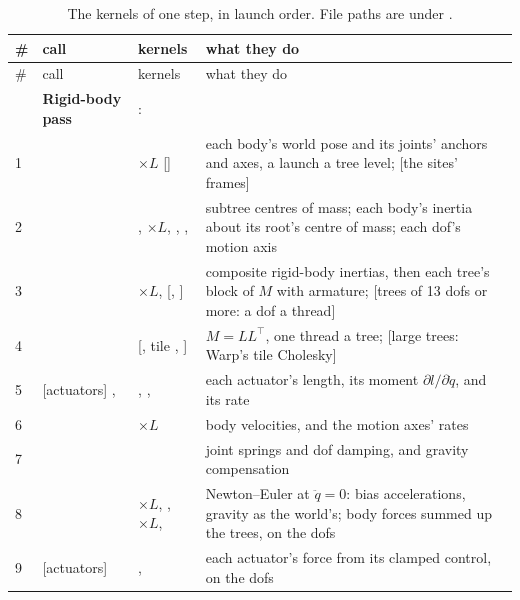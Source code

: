 \begingroup\footnotesize
\begin{longtable}{@{}L{4mm}L{27mm}L{54mm}L{63mm}@{}}
\caption{The kernels of one step, in launch order. File paths are under .}\label{tab:kernels}\\
\toprule
\# & call & kernels & what they do \\
\midrule
\endfirsthead
\toprule
\# & call & kernels & what they do \\
\midrule
\endhead
& \textbf{Rigid-body pass} & :  & \\
1 &  &  $\times L$ [] & each body's world pose and its joints' anchors and axes, a launch a tree level; [the sites' frames] \\
2 &  & ,  $\times L$, , ,  & subtree centres of mass; each body's inertia about its root's centre of mass; each dof's motion axis \\
3 &  &  $\times L$,  [, ] & composite rigid-body inertias, then each tree's block of $M$ with armature; [trees of 13 dofs or more: a dof a thread] \\
4 &  &  [, tile , ] & $M = LL^\top$, one thread a tree; [large trees: Warp's tile Cholesky] \\
5 & [actuators] ,  & , ,  & each actuator's length, its moment $\partial l / \partial \dot q$, and its rate \\
6 &  &  $\times L$ & body velocities, and the motion axes' rates \\
7 &  &  & joint springs and dof damping, and gravity compensation \\
8 &  &  $\times L$, ,  $\times L$,  & Newton--Euler at $\ddot q = 0$: bias accelerations, gravity as the world's; body forces summed up the trees, on the dofs \\
9 & [actuators]  & ,  & each actuator's force from its clamped control, on the dofs \\

\end{longtable}
